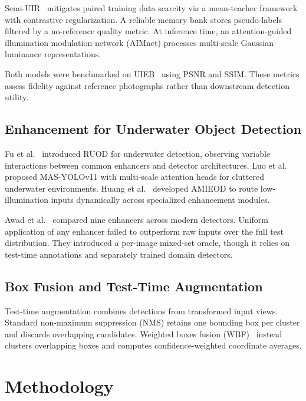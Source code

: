 \documentclass[runningheads]{llncs}
\begin{document}
Semi-UIR~\cite{huangContrastiveSemisupervisedLearning2023} mitigates paired training data scarcity via a mean-teacher framework with contrastive regularization. A reliable memory bank stores pseudo-labels filtered by a no-reference quality metric. At inference time, an attention-guided illumination modulation network (AIMnet) processes multi-scale Gaussian luminance representations.

Both models were benchmarked on UIEB~\cite{liUnderwaterImageEnhancement2019} using PSNR and SSIM. These metrics assess fidelity against reference photographs rather than downstream detection utility.

\subsection{Enhancement for Underwater Object Detection}

Fu et al.~\cite{fuRethinkingGeneralUnderwater2023} introduced RUOD for underwater detection, observing variable interactions between common enhancers and detector architectures. Luo et al.~\cite{luoMASYOLOv11ImprovedUnderwater2025} proposed MAS-YOLOv11 with multi-scale attention heads for cluttered underwater environments. Huang et al.~\cite{huangAMIEODAdaptiveMultiExperts2026} developed AMIEOD to route low-illumination inputs dynamically across specialized enhancement modules.

Awad et al.~\cite{awadRevisitingUnderwaterImage2026} compared nine enhancers across modern detectors. Uniform application of any enhancer failed to outperform raw inputs over the full test distribution. They introduced a per-image mixed-set oracle, though it relies on test-time annotations and separately trained domain detectors.

\subsection{Box Fusion and Test-Time Augmentation}

Test-time augmentation combines detections from transformed input views. Standard non-maximum suppression (NMS) retains one bounding box per cluster and discards overlapping candidates. Weighted boxes fusion (WBF)~\cite{solovyevWeightedBoxesFusion2021} instead clusters overlapping boxes and computes confidence-weighted coordinate averages.

\section{Methodology}
\label{sec:method}
\end{document}
